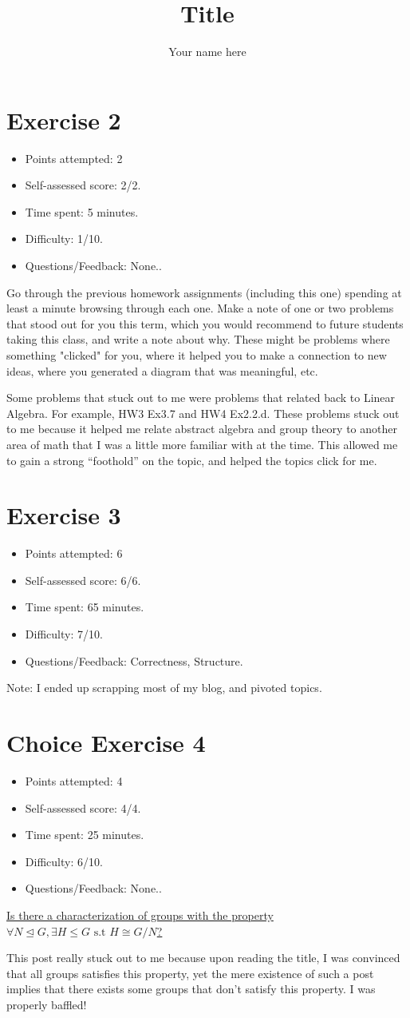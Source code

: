 \documentclass{article}
\title{Title}
\author{Your name here}
\newcommand{\normsube}{\unlhd}
\newcommand{\reflection}[5]{
    \begin{itemize}
    \item Points attempted: #1
    \item Self-assessed score: #2/#1.
    \item Time spent: #3 minutes.
    \item Difficulty: #4/10.
    \item Questions/Feedback: #5.
    \end{itemize}
}
\begin{document}
\maketitle

\section*{Exercise 2}
\reflection{2}{2}{5}{1}{None.}
Go through the previous homework assignments (including this one) spending at least a minute browsing through each one. Make a note of one or two problems that stood out for you this term, which you would recommend to future students taking this class, and write a note about why. These might be problems where something "clicked" for you, where it helped you to make a connection to new ideas, where you generated a diagram that was meaningful, etc.
  
Some problems that stuck out to me were problems that related back to Linear Algebra.
For example, HW3 Ex3.7 and HW4 Ex2.2.d. These problems stuck out to me because 
it helped me relate abstract algebra and group theory to another area of math 
that I was a little more familiar with at the time. This allowed me to gain a 
strong ``foothold'' on the topic, and helped the topics click for me.
\pagebreak

\section*{Exercise 3}
\reflection{6}{6}{65}{7}{Correctness, Structure}

Note: I ended up scrapping most of my blog, and pivoted topics.
\pagebreak

\section*{Choice Exercise 4}
\reflection{4}{4}{25}{6}{None.}

\href{https://math.stackexchange.com/questions/267521/is-there-a-characterization-of-groups-with-the-property-forall-n-unlhd-g-ex}{
    Is there a characterization of groups with the property \(\forall N \normsube G, \exists H \le G \text{ s.t } H \cong G/N\)?
}

This post really stuck out to me because upon reading the title, I was convinced
that all groups satisfies this property, yet the mere existence of such a post
implies that there exists some groups that don't satisfy this property. I was 
properly baffled! 
\end{document}
